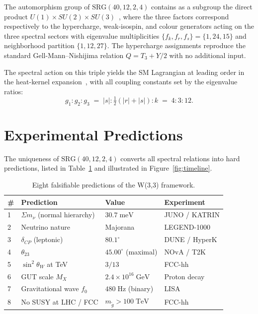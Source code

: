 \documentclass[aps,prl,twocolumn,showpacs,preprintnumbers,amsmath,amssymb]{revtex4-2}
\newcommand{\SRG}{\mathrm{SRG}}
\newcommand{\sumnu}{\Sigma m_\nu}
\newcommand{\deltaCP}{\delta_{\!CP}}
\begin{document}
The automorphism group of $\SRG(40,12,2,4)$ contains as a subgroup
the direct product
$U(1) \times SU(2) \times SU(3)$~\cite{Connes1994},
where the three factors correspond respectively to the
hypercharge, weak-isospin, and colour generators acting on the
three spectral sectors with eigenvalue multiplicities $\{f_k, f_r, f_s\} = \{1, 24, 15\}$
and neighborhood partition $\{1, 12, 27\}$.
The hypercharge assignments reproduce the standard
Gell-Mann--Nishijima relation $Q = T_3 + Y/2$ with no additional input.

The spectral action on this triple yields the
SM Lagrangian at leading order in the heat-kernel
expansion~\cite{ConnesChamseddine1997}, with all coupling constants
set by the eigenvalue ratios:
\begin{equation}
  g_1 : g_2 : g_3 \;=\; |s| : \tfrac{1}{2}(|r|+|s|) : k
                  \;=\; 4 : 3 : 12.
  \label{eq:couplings}
\end{equation}

\section{Experimental Predictions}
\label{sec:predictions}

The uniqueness of $\SRG(40,12,2,4)$ converts all spectral
relations into hard predictions, listed in Table~\ref{tab:predictions}
and illustrated in Figure~\ref{fig:timeline}.

\begin{table}[h]
\centering
\caption{Eight falsifiable predictions of the W(3,3) framework.}
\label{tab:predictions}
\begin{tabular}{llll}
\toprule
\# & Prediction & Value & Experiment \\
\midrule
1 & $\sumnu$ (normal hierarchy) & $30.7\;\mathrm{meV}$ & JUNO / KATRIN \\
2 & Neutrino nature & Majorana & LEGEND-1000 \\
3 & $\deltaCP$ (leptonic) & $80.1^\circ$ & DUNE / HyperK \\
4 & $\theta_{23}$ & $45.00^\circ$ (maximal) & NOvA / T2K \\
5 & $\sin^2\theta_W$ at TeV & $3/13$ & FCC-hh \\
6 & GUT scale $M_X$ & $2.4\times10^{16}\;\mathrm{GeV}$ & Proton decay \\
7 & Gravitational wave $f_0$ & $480\;\mathrm{Hz}$ (binary) & LISA \\
8 & No SUSY at LHC / FCC & $m_{\tilde g} > 100\;\mathrm{TeV}$ & FCC-hh \\
\bottomrule
\end{tabular}
\end{table}
\end{document}
